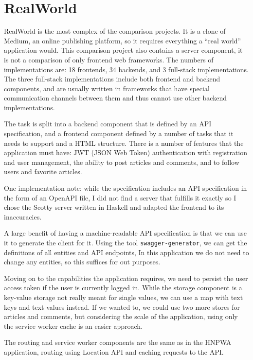 \documentclass[english,odsaz]{fitthesis}
\begin{document}
\section{RealWorld}
\label{sec:org47c07e9}
RealWorld \cite{realworld} is the most complex of the comparison projects. It is a
clone of Medium, an online publishing platform, so it requires everything a
``real world'' application would. This comparison project also contains a server
component, it is not a comparison of only frontend web frameworks. The numbers
of implementations are: 18 frontends, 34 backends, and 3 full-stack
implementations. The three full-stack implementations include both frontend and
backend components, and are usually written in frameworks that have special
communication channels between them and thus cannot use other backend
implementations.

The task is split into a backend component that is defined by an API
specification, and a frontend component defined by a number of tasks that it
needs to support and a HTML structure. There is a number of features that the
application must have: JWT (JSON Web Token) authentication with registration and
user management, the ability to post articles and comments, and to follow users
and favorite articles.

One implementation note: while the specification includes an API specification
in the form of an OpenAPI file, I did not find a server that fulfills it exactly
so I chose the Scotty server written in Haskell and adapted the frontend to its
inaccuracies.

A large benefit of having a machine-readable API specification is that we can
use it to generate the client for it. Using the tool \texttt{swagger-generator}, we can
get the definitions of all entities and API endpoints, In this application we do
not need to change any entities, so this suffices for out purposes.

Moving on to the capabilities the application requires, we need to persist the
user access token if the user is currently logged in. While the storage
component is a key-value storage not really meant for single values, we can use
a map with text keys and text values instead. If we wanted to, we could use two
more stores for articles and comments, but considering the scale of the
application, using only the service worker cache is an easier approach.

The routing and service worker components are the same as in the HNPWA
application, routing using Location API and caching requests to the API.
\end{document}
